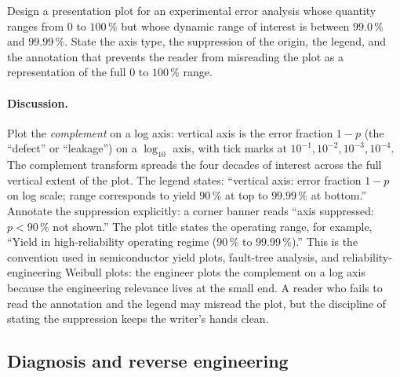\begin{exercise}
Design a presentation plot for an experimental error analysis whose
quantity ranges from $0$ to $100\,\%$ but whose dynamic range of
interest is between $99.0\,\%$ and $99.99\,\%$. State the axis
type, the suppression of the origin, the legend, and the annotation
that prevents the reader from misreading the plot as a representation
of the full $0$ to $100\,\%$ range.

\paragraph{Discussion.}
Plot the \emph{complement} on a log axis: vertical axis is the
error fraction $1 - p$ (the ``defect'' or ``leakage'') on a
$\log_{10}$ axis, with tick marks at $10^{-1}, 10^{-2}, 10^{-3},
10^{-4}$. The complement transform spreads the four decades of
interest across the full vertical extent of the plot. The legend
states: ``vertical axis: error fraction $1 - p$ on log scale;
range corresponds to yield $90\,\%$ at top to $99.99\,\%$ at
bottom.'' Annotate the suppression explicitly: a corner banner
reads ``axis suppressed: $p < 90\,\%$ not shown.'' The plot title
states the operating range, for example, ``Yield in
high-reliability operating regime (90\,\% to 99.99\,\%).'' This is
the convention used in semiconductor yield plots, fault-tree
analysis, and reliability-engineering Weibull plots: the engineer
plots the complement on a log axis because the engineering
relevance lives at the small end. A reader who fails to read the
annotation and the legend may misread the plot, but the
discipline of stating the suppression keeps the writer's hands
clean.
\end{exercise}

\subsection*{Diagnosis and reverse engineering}

